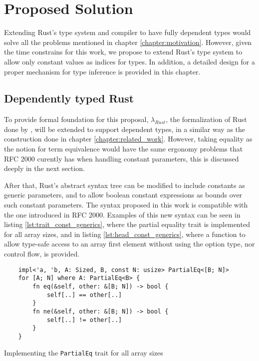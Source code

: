 \chapter{Proposed Solution}
\label{chapter:proposed_solution}

Extending Rust's type system and compiler to have fully dependent types would
solve all the problems mentioned in chapter \ref{chapter:motivation}. However,
given the time constrains for this work, we propose to extend Rust's type system
to allow only constant values as indices for types. In addition, a detailed
design for a proper mechanism for type inference is provided in this chapter.

\section{Dependently typed Rust}

To provide formal foundation for this proposal, $\lambda_{Rust}$, the
formalization of Rust done by \citet{ralf}, will be extended to support
dependent types, in a similar way as the construction done in chapter
\ref{chapter:related_work}. However, taking equality as the notion for term
equivalence would have the same ergonomy problems that RFC 2000 curently has
when handling constant parameters, this is discussed deeply in the next section.

After that, Rust's abstract syntax tree can be modified to include constants as
generic parameters, and to allow boolean constant expressions as bounds over
such constant parameters. The syntax proposed in this work is compatible with
the one introduced in RFC 2000. Examples of this new syntax can be seen in
listing \ref{lst:trait_const_generics}, where the partial equality trait is
implemented for all array sizes, and in listing \ref{lst:head_const_generics},
where a function to allow type-safe access to an array first element without
using the option type, nor control flow, is provided. 

\begin{listing}[ht]
	\begin{verbatim}
    impl<'a, 'b, A: Sized, B, const N: usize> PartialEq<[B; N]> 
    for [A; N] where A: PartialEq<B> {
        fn eq(&self, other: &[B; N]) -> bool {
            self[..] == other[..]
        }
        fn ne(&self, other: &[B; N]) -> bool {
            self[..] != other[..]
        }
    }
	\end{verbatim}
    \caption{Implementing the \texttt{PartialEq} trait for all array sizes}
  \label{lst:trait_const_generics}
\end{listing}


